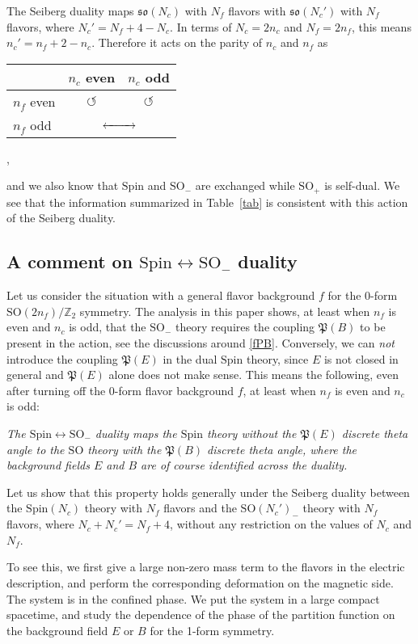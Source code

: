 \documentclass[12pt]{article}
\numberwithin{equation}{section}
\newenvironment{claim}{  \begin{mdframed}[linecolor=black!0,backgroundcolor=black!10]\noindent\itshape\ignorespaces}{\end{mdframed}}
\newcommand*{\bZ}{\mathbb{Z}}
\newcommand*{\fP}{\mathfrak{P}}
\def\SO{\mathrm{SO}}
\def\Spin{\mathrm{Spin}}
\begin{document}
The Seiberg duality maps $\mathfrak{so}(N_c)$ with $N_f$ flavors with $\mathfrak{so}(N_c')$ with $N_f$ flavors,
where $N_c'=N_f+4-N_c$.
In terms of $N_c=2n_c$ and $N_f=2n_f$, this means $n_c'=n_f+2-n_c$.
Therefore it acts on the parity of $n_c$ and $n_f$  as 
\begin{center}
	\begin{tabular}{l|cc}
		& $n_c$ even & $n_c$ odd\\
		\hline
		$n_f$ even   & $\circlearrowleft$ & $\circlearrowleft$\\
		$n_f$ odd    & \multicolumn{2}{c}{$\xleftrightarrow{\qquad\ }$}
	\end{tabular},
\end{center}
and we also know that $\Spin$ and $\SO_-$ are exchanged while $\SO_+$ is self-dual.
We see that the information summarized in Table~\ref{tab} is consistent with this action of the Seiberg duality.


\subsection{A comment on $\Spin\leftrightarrow\SO_-$ duality}
\label{sec:last}
Let us consider the situation with a general flavor background $f$ for the 0-form $\SO(2n_f)/\bZ_2$ symmetry.
The analysis in this paper shows, at least when $n_f$ is even and $n_c$ is odd, 
that the $\SO_-$ theory requires the coupling $\fP(B)$ to be present in the action, 
see the discussions around \eqref{fPB}.
Conversely, we can \emph{not} introduce the coupling $\fP(E)$ in the dual $\Spin$ theory, 
since $E$ is not closed in general and $\fP(E)$ alone does not make sense.
This means the following, even after turning off the 0-form flavor background $f$, at least when $n_f$ is even and $n_c$ is odd:
\begin{claim}
The $\Spin\leftrightarrow\SO_-$ duality maps
the $\Spin$ theory \emph{without} the $\fP(E)$ discrete theta angle to
the $\SO$ theory \emph{with} the $\fP(B)$ discrete theta angle,
where the background fields $E$ and $B$ are of course identified across the duality.
\end{claim}
Let us show that this property holds generally under the Seiberg duality between the $\Spin(N_c)$ theory with $N_f$ flavors and the $\SO(N_c')_-$ theory with $N_f$ flavors, where $N_c+N_c'=N_f+4$,
without any restriction on the values of $N_c$ and $N_f$.

To see this, we first give a large non-zero mass term to the flavors in the electric description,
and perform the corresponding deformation on the magnetic side.
The system is in the confined phase. 
We put the system in a large compact spacetime, and 
study the dependence of the phase of the partition function on the background field $E$ or $B$ for the 1-form symmetry.
\end{document}
